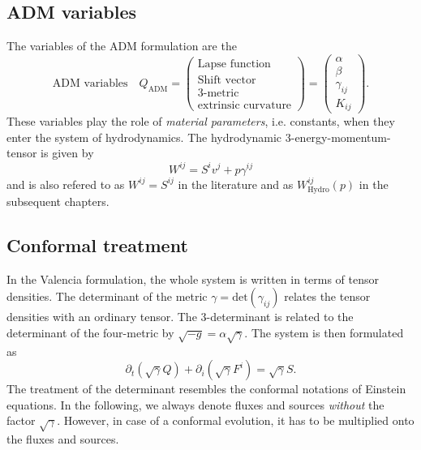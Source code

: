 \documentclass[a4paper]{article}
\newcommand{\desc}[1]{\text{#1}\quad}
\newcommand{\hydro}{\text{Hydro}}
\newcommand{\adm}{\text{ADM}}
\begin{document}
\subsection{ADM variables}
The variables of the ADM formulation are the
\begin{equation}
\desc{ADM variables}
Q_\adm =
\begin{pmatrix}
\text{Lapse function} \\
\text{Shift vector} \\
\text{3-metric} \\
\text{extrinsic curvature}
\end{pmatrix}
=
\begin{pmatrix}
\alpha \\ \beta \\ \gamma_{ij} \\ K_{ij}
\end{pmatrix}.
\end{equation}
These variables play the role of \emph{material parameters}, i.e.
constants, when they enter the system of hydrodynamics.
The hydrodynamic 3-energy-momentum-tensor is given by
\begin{equation}\label{eq.grhd.emtensor}
W^{ij} = S^i v^j + p \gamma^{ij}
\end{equation}
and is also refered to as $W^{ij}=S^{ij}$ in the literature and as
$W_\hydro^{ij}(p)$ in the subsequent chapters.

\subsection{Conformal treatment}
In the Valencia formulation, the whole system is written in terms
of tensor densities. The determinant of the metric
$\gamma=\text{det}(\gamma_{ij})$ relates the tensor densities with
an ordinary tensor. The 3-determinant is related to the determinant of
the four-metric by $\sqrt{-g}=\alpha\sqrt{\gamma}$. The system is
then formulated as
\begin{equation}
\partial_t (\sqrt{\gamma} Q)
+ \partial_i (\sqrt{\gamma} F^i) = \sqrt{\gamma} S.
\end{equation}
The treatment of the determinant resembles the conformal notations of
Einstein equations. In the following, we always denote fluxes and
sources \emph{without} the factor $\sqrt{\gamma}$. However, in case of
a conformal evolution, it has to be multiplied onto the fluxes and
sources.
\end{document}
